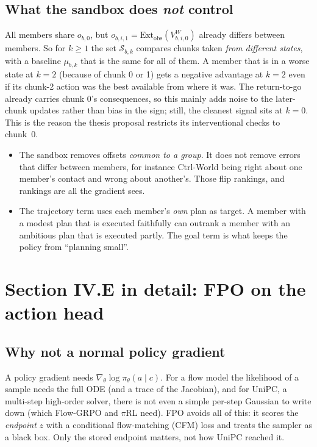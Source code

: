 \documentclass[11pt,a4paper]{article}
\newcommand{\VW}{V^{W}}
\theoremstyle{remark}
\begin{document}
\subsection{What the sandbox does \emph{not} control}
\begin{caveat}
All members share $o_{b,0}$, but $o_{b,i,1}=\mathrm{Ext}_{\mathrm{obs}}(\VW_{b,i,0})$ already differs between members. So for $k\ge1$ the set $\mathcal S_{b,k}$ compares chunks taken \emph{from different states}, with a baseline $\mu_{b,k}$ that is the same for all of them. A member that is in a worse state at $k=2$ (because of chunk 0 or 1) gets a negative advantage at $k=2$ even if its chunk-2 action was the best available from where it was. The return-to-go already carries chunk 0's consequences, so this mainly adds noise to the later-chunk updates rather than bias in the sign; still, the cleanest signal sits at $k=0$. This is the reason the thesis proposal restricts its interventional checks to chunk~0.
\end{caveat}
\begin{itemize}
\item The sandbox removes offsets \emph{common to a group}. It does not remove errors that differ between members, for instance Ctrl-World being right about one member's contact and wrong about another's. Those flip rankings, and rankings are all the gradient sees.
\item The trajectory term uses each member's \emph{own} plan as target. A member with a modest plan that is executed faithfully can outrank a member with an ambitious plan that is executed partly. The goal term is what keeps the policy from ``planning small''.
\end{itemize}

\section{Section IV.E in detail: FPO on the action head}

\subsection{Why not a normal policy gradient}
A policy gradient needs $\nabla_\theta\log\pi_\theta(a\mid c)$. For a flow model the likelihood of a sample needs the full ODE (and a trace of the Jacobian), and for UniPC, a multi-step high-order solver, there is not even a simple per-step Gaussian to write down (which Flow-GRPO and $\pi$RL need). FPO avoids all of this: it scores the \emph{endpoint} $z$ with a conditional flow-matching (CFM) loss and treats the sampler as a black box. Only the stored endpoint matters, not how UniPC reached it.
\end{document}
